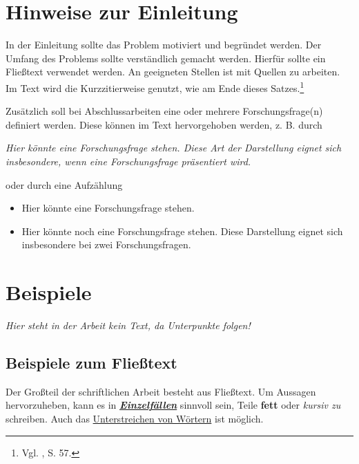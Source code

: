 \section{Hinweise zur Einleitung}

In der Einleitung sollte das Problem motiviert und begründet werden. Der Umfang des Problems sollte verständlich gemacht werden. Hierfür sollte ein Fließtext verwendet werden. An geeigneten Stellen ist mit Quellen zu arbeiten. Im Text wird die Kurzzitierweise genutzt, wie am Ende dieses Satzes.\footnote{Vgl. \textcite{beispielname2024beispieltitel}, S. 57.} 

Zusätzlich soll bei Abschlussarbeiten eine oder mehrere Forschungsfrage(n) definiert werden. Diese können im Text hervorgehoben werden, z. B. durch 
\begin{center}
    \textit{Hier könnte eine Forschungsfrage stehen. Diese Art der Darstellung eignet sich insbesondere, wenn eine Forschungsfrage präsentiert wird.}
\end{center}
oder durch eine Aufzählung
\begin{itemize}
    \item Hier könnte eine Forschungsfrage stehen.
    \item Hier könnte noch eine Forschungsfrage stehen. Diese Darstellung eignet sich insbesondere bei zwei Forschungsfragen.
\end{itemize}



\section{Beispiele}
\textit{Hier steht in der Arbeit kein Text, da Unterpunkte folgen!}


\subsection{Beispiele zum Fließtext}
Der Großteil der schriftlichen Arbeit besteht aus Fließtext. Um Aussagen hervorzuheben, kann es in \underline{\textbf{\textit{Einzelfällen}}} sinnvoll sein, Teile \textbf{fett} oder \textit{kursiv zu} schreiben. Auch das \underline{Unterstreichen von Wörtern} ist möglich. 


